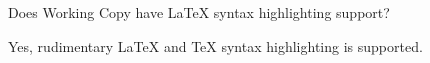 \documentclass{article}
\begin{document}
\begin{question}
 Does Working Copy have LaTeX syntax highlighting support?
\end{question}

\begin{answer}
 Yes, rudimentary LaTeX and TeX syntax highlighting is supported.
\end{answer}

\end{document}

